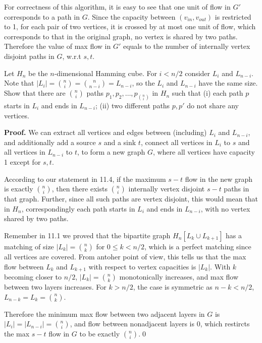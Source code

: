 \documentclass[12pt,a4]{article}
\begin{document}
\begin{enumerate}
For correctness of this algorithm, it is easy to see that one unit of flow in $G'$ corresponds to a path in $G$. Since the capacity between $(v_{in},v_{out})$ is restricted to 1, for each pair of two vertices, it is crossed by at most one unit of flow, which corresponds to that in the original graph, no vertex is shared by two paths. Therefore the value of max flow in $G'$ equals to the number of internally vertex disjoint paths in $G$, w.r.t $s,t$.
\end{enumerate}
\begin{exercise} 
  Let $H_n$ be the $n$-dimensional Hamming cube. For $i < n/2$ consider
  $L_i$ and $L_{n-i}$. Note that 
  $|L_i| = {n \choose i} = { n \choose n-i}  = L_{n-i}$, so the 
  $L_i$ and $L_{n-i}$ have the same size.   Show that there are ${n \choose i}$ paths $p_1,p_2,\dots,p_{ {n \choose i}}$
  in $H_n$ such that
  (i) each path $p$ starts in $L_i$ and ends in $L_{n-i}$;
  (ii) two different paths $p,p'$ do not share any vertices.
\end{exercise}
\textbf{Proof.} We can extract all vertices and edges between (including) $L_i$ and $L_{n-i}$, and additionally add a source $s$ and a sink $t$, connect all vertices in $L_i$ to $s$ and all vertices in $L_{n-i}$ to $t$, to form a new graph $G$, where all vertices have capacity 1 except for $s,t$. 

According to our statement in 11.4, if the maximum $s-t$ flow in the new graph is exactly ${n \choose i}$, then there exists ${n \choose i}$ internally vertex disjoint $s-t$ paths in that graph. Further, since all such paths are vertex disjoint, this would mean that in $H_n$, correspondingly each path starts in $L_i$ and ends in $L_{n-i}$, with no vertex shared by two paths.

Remember in 11.1 we proved that the bipartite graph $H_n [L_k \cup L_{k+1}]$ has a matching of size $|L_k| = {n \choose k}$ for $0 \leq k < n/2$, which is a perfect matching since all vertices are covered. From antoher point of view, this tells us that the max flow between $L_k$ and $L_{k+1}$ with respect to vertex capacities is $|L_k|$. With $k$ becoming closer to $n/2$, $|L_k| = {n \choose k}$ monotonically increases, and max flow between two layers increases. For $k>n/2$, the case is symmetric as $n-k<n/2$, $L_{n-k}=L_k={n \choose k}$. 

Therefore the minimum max flow between two adjacent layers in $G$ is $|L_i|=|L_{n-i}|={n \choose i}$, and flow between nonadjacent layers is 0, which restircts the max $s-t$ flow in $G$ to be exactly ${n \choose i}$.\qed
\end{document}
